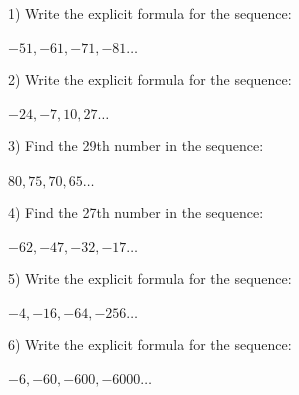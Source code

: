 \documentclass[12pt]{article}
\begin{document}
                        \begin{minipage}{\textwidth}1) Write the explicit formula for the sequence: \\ \\
$-51, -61, -71, -81 \ldots $ 

\hrulefill



\end{minipage}\begin{minipage}{\textwidth}2) Write the explicit formula for the sequence: \\ \\
$-24, -7, 10, 27 \ldots $ 

\hrulefill






\end{minipage}\begin{minipage}{\textwidth}3) Find the 29th number in the sequence: \\ \\
$80, 75, 70, 65\ldots $ 


\hrulefill




\end{minipage}\begin{minipage}{\textwidth}4) Find the 27th number in the sequence: \\ \\
$-62, -47, -32, -17\ldots $ 


\hrulefill





\end{minipage}\begin{minipage}{\textwidth}5) Write the explicit formula for the sequence: \\ \\
$-4, -16, -64, -256\ldots $


\hrulefill



\end{minipage}\begin{minipage}{\textwidth}6) Write the explicit formula for the sequence: \\ \\
$-6, -60, -600, -6000\ldots $



\end{minipage}
\end{document}
